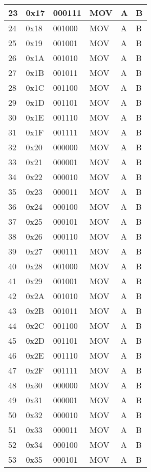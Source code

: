 \documentclass[twoside,a4paper]{memoir}
\begin{document}
\begin{table}[]
\begin{tabular}{|l|l|l|l|l|l|}
23 & 0x17 & 000111 & MOV  & A & B \\ \hline
24 & 0x18 & 001000 & MOV  & A & B \\ \hline
25 & 0x19 & 001001 & MOV  & A & B \\ \hline
26 & 0x1A & 001010 & MOV  & A & B \\ \hline
27 & 0x1B & 001011 & MOV  & A & B \\ \hline
28 & 0x1C & 001100 & MOV  & A & B \\ \hline
29 & 0x1D & 001101 & MOV  & A & B \\ \hline
30 & 0x1E & 001110 & MOV  & A & B \\ \hline
31 & 0x1F & 001111 & MOV  & A & B \\ \hline
32 & 0x20 & 000000 & MOV  & A & B \\ \hline
33 & 0x21 & 000001 & MOV  & A & B \\ \hline
34 & 0x22 & 000010 & MOV  & A & B \\ \hline
35 & 0x23 & 000011 & MOV  & A & B \\ \hline
36 & 0x24 & 000100 & MOV  & A & B \\ \hline
37 & 0x25 & 000101 & MOV  & A & B \\ \hline
38 & 0x26 & 000110 & MOV  & A & B \\ \hline
39 & 0x27 & 000111 & MOV  & A & B \\ \hline
40 & 0x28 & 001000 & MOV  & A & B \\ \hline
41 & 0x29 & 001001 & MOV  & A & B \\ \hline
42 & 0x2A & 001010 & MOV  & A & B \\ \hline
43 & 0x2B & 001011 & MOV  & A & B \\ \hline
44 & 0x2C & 001100 & MOV  & A & B \\ \hline
45 & 0x2D & 001101 & MOV  & A & B \\ \hline
46 & 0x2E & 001110 & MOV  & A & B \\ \hline
47 & 0x2F & 001111 & MOV  & A & B \\ \hline
48 & 0x30 & 000000 & MOV  & A & B \\ \hline
49 & 0x31 & 000001 & MOV  & A & B \\ \hline
50 & 0x32 & 000010 & MOV  & A & B \\ \hline
51 & 0x33 & 000011 & MOV  & A & B \\ \hline
52 & 0x34 & 000100 & MOV  & A & B \\ \hline
53 & 0x35 & 000101 & MOV  & A & B \\ \hline

\end{tabular}
\end{table}
\end{document}
